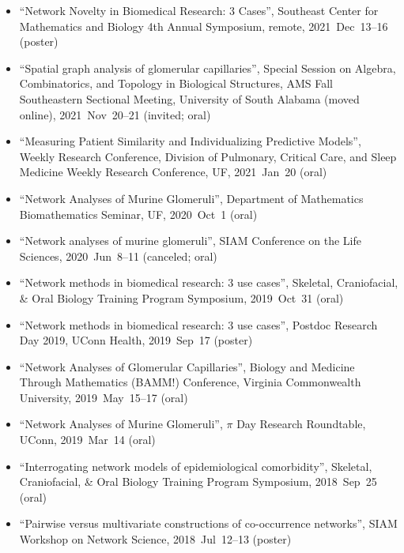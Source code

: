 \documentclass[10pt,a4paper]{article}
\begin{document}
\begin{itemize}[label=$\circ$,nolistsep]
\item
``Network Novelty in Biomedical Research: 3 Cases'', Southeast Center for Mathematics and Biology 4th Annual Symposium, remote, 2021~Dec~13--16 (poster)
\item
``Spatial graph analysis of glomerular capillaries'', Special Session on Algebra, Combinatorics, and Topology in Biological Structures, AMS Fall Southeastern Sectional Meeting, University of South Alabama (moved online), 2021~Nov~20--21 (invited; oral)
\item
``Measuring Patient Similarity and Individualizing Predictive Models'', Weekly Research Conference, Division of Pulmonary, Critical Care, and Sleep Medicine Weekly Research Conference, UF, 2021~Jan~20 (oral)
\item
``Network Analyses of Murine Glomeruli'', Department of Mathematics Biomathematics Seminar, UF, 2020~Oct~1 (oral)
\item
``Network analyses of murine glomeruli'', SIAM Conference on the Life Sciences, 2020~Jun~8--11 (canceled; oral)
\item
``Network methods in biomedical research: 3 use cases'', Skeletal, Craniofacial, \& Oral Biology Training Program Symposium, 2019~Oct~31 (oral)
\item
``Network methods in biomedical research: 3 use cases'', Postdoc Research Day 2019, UConn Health, 2019~Sep~17 (poster)
\item
``Network Analyses of Glomerular Capillaries'', Biology and Medicine Through Mathematics (BAMM!) Conference, Virginia Commonwealth University, 2019~May~15--17 (oral)
\item
``Network Analyses of Murine Glomeruli'', $\pi$ Day Research Roundtable, UConn, 2019~Mar~14 (oral)
\item
``Interrogating network models of epidemiological comorbidity'', Skeletal, Craniofacial, \& Oral Biology Training Program Symposium, 2018~Sep~25 (oral)
\item
``Pairwise versus multivariate constructions of co-occurrence networks'', SIAM Workshop on Network Science, 2018~Jul~12--13 (poster)

\end{itemize}
\end{document}

